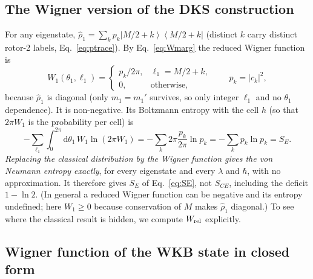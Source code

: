 \documentclass[aps,pra,onecolumn,notitlepage,nofootinbib,11pt]{revtex4-2}
\newcommand{\ketbra}[2]{\left|#1\right\rangle\!\left\langle#2\right|}
\newcommand{\dd}{\mathrm{d}}
\begin{document}
\subsection{The Wigner version of the DKS construction}

For any eigenstate, $\hat\rho_{1}=\sum_{k}p_{k}\ketbra{M/2+k}{M/2+k}$ (distinct $k$ carry distinct
rotor-2 labels, Eq.~\eqref{eq:ptrace}). By Eq.~\eqref{eq:Wmarg} the reduced Wigner function is
\begin{equation}
W_{1}(\theta_{1},\ell_{1})=\begin{cases}p_{k}/2\pi, & \ell_{1}=M/2+k,\\ 0, & \text{otherwise},\end{cases}
\qquad p_{k}=|c_{k}|^{2},
\label{eq:W1}
\end{equation}
because $\hat\rho_{1}$ is diagonal (only $m_{1}=m_{1}'$ survives, so only integer
$\ell_{1}$ and no $\theta_{1}$ dependence). It is non-negative. Its Boltzmann entropy with
the cell $h$ (so that $2\pi W_{1}$ is the probability per cell) is
\begin{equation}
-\sum_{\ell_{1}}\int_{0}^{2\pi}\dd\theta_{1}\,W_{1}\ln(2\pi W_{1})
=-\sum_{k}2\pi\frac{p_{k}}{2\pi}\ln p_{k}=-\sum_{k}p_{k}\ln p_{k}=S_{E}.
\label{eq:SWig}
\end{equation}
\emph{Replacing the classical distribution by the Wigner function gives the von Neumann
entropy exactly}, for every eigenstate and every $\lambda$ and $\hbar$, with no
approximation. It therefore gives $S_{E}$ of Eq.~\eqref{eq:SE}, not $S_{CE}$, including the
deficit $1-\ln2$. (In general a reduced Wigner function can be negative and its entropy
undefined; here $W_{1}\ge0$ because conservation of $M$ makes $\hat\rho_{1}$ diagonal.)
To see where the classical result is hidden, we compute $W_{\rm rel}$ explicitly.

\subsection{Wigner function of the WKB state in closed form}
\end{document}
